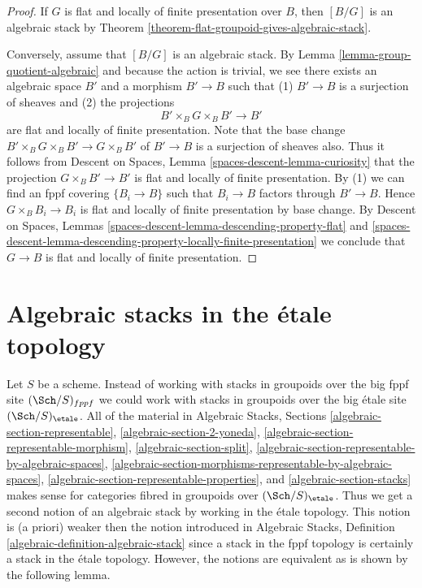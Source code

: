 \begin{proof}
If $G$ is flat and locally of finite presentation over $B$, then
$[B/G]$ is an algebraic stack by
Theorem \ref{theorem-flat-groupoid-gives-algebraic-stack}.

\medskip\noindent
Conversely, assume that $[B/G]$ is an algebraic stack. By
Lemma \ref{lemma-group-quotient-algebraic}
and because the action is trivial, we see
there exists an algebraic space $B'$ and a morphism
$B' \to B$ such that (1) $B' \to B$ is a surjection
of sheaves and (2) the projections
$$
B' \times_B G \times_B B' \to B'
$$
are flat and locally of finite presentation. Note that the base change
$B' \times_B G \times_B B' \to G \times_B B'$ of $B' \to B$
is a surjection of sheaves also. Thus it follows from
Descent on Spaces, Lemma \ref{spaces-descent-lemma-curiosity}
that the projection $G \times_B B' \to B'$ is flat and locally
of finite presentation. By (1) we can find an fppf covering
$\{B_i \to B\}$ such that $B_i \to B$ factors through $B' \to B$.
Hence $G \times_B B_i \to B_i$ is flat and locally of finite presentation
by base change. By
Descent on Spaces, Lemmas
\ref{spaces-descent-lemma-descending-property-flat} and
\ref{spaces-descent-lemma-descending-property-locally-finite-presentation}
we conclude that $G \to B$ is flat and locally of finite presentation.
\end{proof}







\section{Algebraic stacks in the \'etale topology}
\label{section-stacks-etale}

\noindent
Let $S$ be a scheme. Instead of working with stacks in groupoids over
the big fppf site $(\Sch/S)_{fppf}$ we could work with stacks in groupoids
over the big \'etale site $(\Sch/S)_\etale$. All of the material in
Algebraic Stacks, Sections
\ref{algebraic-section-representable},
\ref{algebraic-section-2-yoneda},
\ref{algebraic-section-representable-morphism},
\ref{algebraic-section-split},
\ref{algebraic-section-representable-by-algebraic-spaces},
\ref{algebraic-section-morphisms-representable-by-algebraic-spaces},
\ref{algebraic-section-representable-properties}, and
\ref{algebraic-section-stacks}
makes sense for categories fibred in groupoids over $(\Sch/S)_\etale$.
Thus we get a second notion of an algebraic stack by working in the
\'etale topology. This notion is (a priori) weaker then the notion introduced
in Algebraic Stacks, Definition \ref{algebraic-definition-algebraic-stack}
since a stack in the fppf topology is certainly a stack in the \'etale
topology. However, the notions are equivalent as is shown by the following
lemma.

